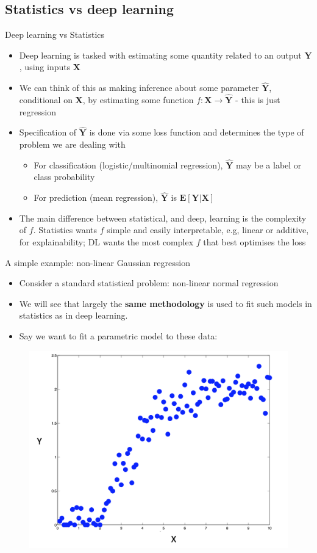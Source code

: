 \documentclass{beamer}
\begin{document}
\subsection{Statistics vs deep learning}
\begin{frame}{Deep learning vs Statistics}
\begin{itemize}
\item Deep learning is tasked with estimating some quantity related to an output $\mathbf{Y}$, using inputs $\mathbf{X}$
\item We can think of this as making inference about some parameter $\hat{\mathbf{Y}}$, conditional on $\mathbf{X}$, by estimating some function $f:\mathbf{X}\rightarrow \hat{\mathbf{Y}}$ - this is just regression
\item Specification of $\hat{\mathbf{Y}}$ is done via some loss function and determines the type of problem we are dealing with
\begin{itemize}
\item For classification (logistic/multinomial regression), $\hat{\mathbf{Y}}$ may be a label or class probability
\item For prediction (mean regression), $\hat{\mathbf{Y}}$ is $\mathbf{E}[\mathbf{Y}|\mathbf{X}]$ 
\end{itemize}
\item The main difference between statistical, and deep, learning is the complexity of $f$. Statistics wants $f$ simple and easily interpretable, e.g, linear or additive, for explainability; DL wants the most complex $f$ that best optimises the loss
\end{itemize}

\end{frame}
\begin{frame}{A simple example: non-linear Gaussian regression}
\begin{itemize}
\item Consider a standard statistical problem: non-linear normal regression
\vfill
\item We will see that largely the \textbf{same methodology} is used to fit such models in statistics as in deep learning.

\item Say we want to fit a parametric model to these data:
\end{itemize}
\begin{figure}
\includegraphics[width=0.6\linewidth]{Images/NL_reg.png}
\end{figure}
\end{frame}
\end{document}
